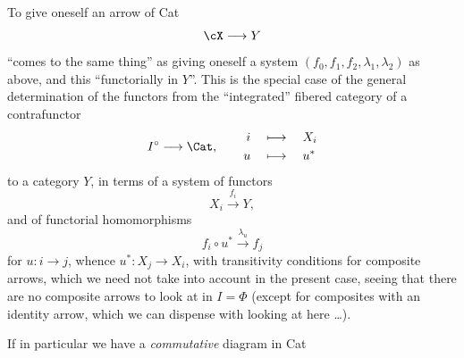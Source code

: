 To give oneself an arrow of Cat
\[
\cX \longrightarrow Y
\]
``comes to the same thing'' as giving oneself a system $(f_0, f_1, f_2, \lambda_1, \lambda_2)$ as above, and this ``functorially in $Y$''. This is the special case of the general determination of the functors from the ``integrated'' fibered category of a contrafunctor
\[
I^{\circ} \longrightarrow \Cat, \qquad
\begin{aligned}
i &\quad\longmapsto\quad X_i\\
u &\quad\longmapsto\quad u^*
\end{aligned}
\]
to a category $Y$, in terms of a system of functors
\[
X_i \xrightarrow{f_i} Y,
\]
and of functorial homomorphisms
\[
f_i\circ u^* \xrightarrow{\lambda_u} f_j
\]
for $u : i \longrightarrow j$, whence $u^* : X_j \longrightarrow X_i$, with transitivity conditions for composite arrows, which we need not take into account in the present case, seeing that there are no composite arrows to look at in $I = \Phi$ (except for composites with an identity arrow, which we can dispense with looking at here \dots).

If in particular we have a \textit{commutative} diagram in Cat